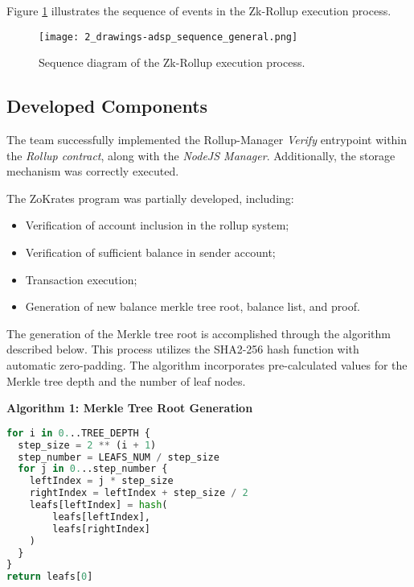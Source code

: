 Figure \ref{fig:2_drawings-adsp_sequence_general.png} illustrates the sequence of events in the Zk-Rollup execution process.

\begin{figure}[ht]
  \centering
  \texttt{[image: 2\_drawings-adsp\_sequence\_general.png]}
  \caption[Sequence Zk-Rollup]{Sequence diagram of the Zk-Rollup execution process.}  
  \label{fig:2_drawings-adsp_sequence_general.png}
\end{figure} 

\subsection{Developed Components}
The team successfully implemented the Rollup-Manager \textit{Verify} entrypoint within the \textit{Rollup contract}, along with the \textit{NodeJS Manager}. Additionally, the storage mechanism was correctly executed.

The ZoKrates program was partially developed, including:
\begin{itemize}
    \item Verification of account inclusion in the rollup system;
    \item Verification of sufficient balance in sender account;
    \item Transaction execution;
    \item Generation of new balance merkle tree root, balance list, and proof.
\end{itemize}

The generation of the Merkle tree root is accomplished through the algorithm described below. This process utilizes the SHA2-256 hash function with automatic zero-padding. The algorithm incorporates pre-calculated values for the Merkle tree depth and the number of leaf nodes.

\noindent\textbf{Algorithm 1: Merkle Tree Root Generation}
\begin{lstlisting}[language=Python]
for i in 0...TREE_DEPTH {
  step_size = 2 ** (i + 1)
  step_number = LEAFS_NUM / step_size
  for j in 0...step_number {
    leftIndex = j * step_size
    rightIndex = leftIndex + step_size / 2
    leafs[leftIndex] = hash(
        leafs[leftIndex],
        leafs[rightIndex]
    )
  }
}
return leafs[0]
\end{lstlisting}

